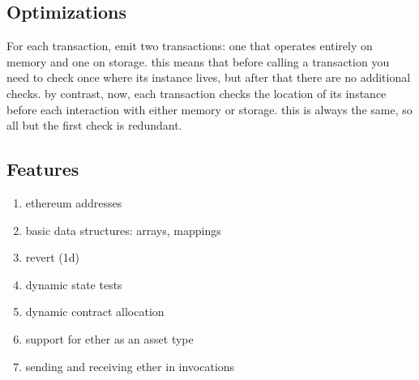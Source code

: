 \subsection{Optimizations}

For each transaction, emit two transactions: one that operates entirely on
memory and one on storage. this means that before calling a transaction you
need to check once where its instance lives, but after that there are no
additional checks. by contrast, now, each transaction checks the location
of its instance before each interaction with either memory or storage. this
is always the same, so all but the first check is redundant.

\subsection{Features}

\begin{enumerate} %
\item ethereum addresses
\item basic data structures: arrays, mappings
\item revert (1d)
\item dynamic state tests
\item dynamic contract allocation
\item support for ether as an asset type
\item sending and receiving ether in invocations
\end{enumerate}
